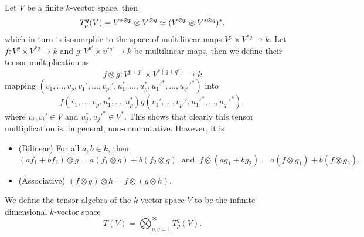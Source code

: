 \begin{definition}
  Let \(V\) be a finite \(k\)-vector space, then
  \[
    T_p^q(V) = V^{*\otimes p} \otimes V^{\otimes q} \simeq (V^{\otimes p} \otimes V^{* \otimes q})^*,
  \]
  which in turn is isomorphic to the space of multilinear maps \(V^p \times V^{*q} \to
  k\). Let \(f: V^p \times V^{*q} \to k\) and \(g: V^{p'} \times v^{*q'} \to k\) be multilinear
  maps, then we define their tensor multiplication as
  \[
    f \otimes g: V^{p + p'} \times V^{*(q + q')} \to k
  \]
  mapping \((v_1, \dots, v_p, v_1', \dots, v_{p'}', u_1^*, \dots, u_p^*,
  u_1'^{*}, \dots, u_{q'}'^{*})\) into
  \[
    f(v_1, \dots, v_p, u_1^*, \dots, u_p^*)
    g(v_1', \dots, v_{p'}', u_1'^{*}, \dots, u_{q'}'^{*}),
  \]
  where \(v_i, v_i' \in V\) and \(u_j^*, u_j'^{*} \in V^*\). This shows that clearly
  this tensor multiplication is, in general, non-commutative. However, it is
  \begin{itemize}
    \item (Bilinear) For all \(a, b \in k\), then
      \[
        (a f_1 + b f_2) \otimes g = a (f_1 \otimes g) + b (f_2 \otimes g)
        \ \text{ and }\
        f \otimes (a g_1 + b g_2) = a (f \otimes g_1) + b (f \otimes g_2).
      \]
    \item (Associative) \((f \otimes g) \otimes h = f \otimes (g \otimes h)\).
  \end{itemize}
\end{definition}

\begin{definition}\label{def: tensor algebra vs}
  We define the tensor algebra of the \(k\)-vector space \(V\) to be the
  infinite dimensional \(k\)-vector space
  \[
    T(V) = \bigotimes_{p, q = 1}^\infty T_p^q(V).
  \]
\end{definition}

